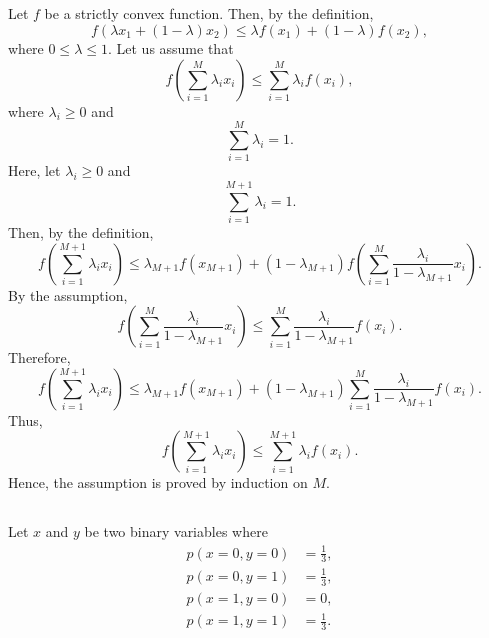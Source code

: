 \subsection{}
\label{1.38}
Let $f$ be a strictly convex function.
Then, by the definition,
%
\begin{equation}
f 
\left( 
	\lambda 
	x_1 
	+ 
	(1 - \lambda) 
	x_2 
\right) 
\leq 
\lambda 
f(x_1) 
+ 
(1 - \lambda) 
f(x_2),
\end{equation}
%
where $0 \leq \lambda \leq 1$.
Let us assume that 
%
\begin{equation}
f 
\left( 
	\sum_{i = 1}^{M} 
	\lambda_i 
	x_i 
\right) 
\leq 
\sum_{i = 1}^{M} 
\lambda_i 
f(x_i),
\end{equation}
%
where $\lambda_i \geq 0$ and
%
\begin{equation}
\sum_{i = 1}^{M} 
\lambda_i 
= 
1.
\end{equation}
%
Here, let $\lambda_i \geq 0$ and
%
\begin{equation}
\sum_{i = 1}^{M + 1} 
\lambda_i 
= 
1.
\end{equation}
%
Then, by the definition,
%
\begin{equation}
f 
\left( 
	\sum_{i = 1}^{M + 1} 
	\lambda_i x_i 
\right) 
\leq 
\lambda_{M + 1} 
f ( x_{M + 1} ) 
+ 
(1 - \lambda_{M + 1}) 
f 
\left( 
	\sum_{i = 1}^{M} 
	\frac{\lambda_i}{1 - \lambda_{M + 1}} 
	x_i 
\right).
\end{equation}
%
By the assumption,
%
\begin{equation}
f 
\left( 
	\sum_{i = 1}^{M} 
	\frac{\lambda_i}{1 - \lambda_{M + 1}} 
	x_i 
\right) 
\leq 
\sum_{i = 1}^{M} 
\frac{\lambda_i}{1 - \lambda_{M + 1}} 
f(x_i).
\end{equation}
%
Therefore,
%
\begin{equation}
f 
\left( 
	\sum_{i = 1}^{M + 1} 
	\lambda_i 
	x_i 
\right) 
\leq 
\lambda_{M + 1} 
f ( x_{M + 1} ) 
+ 
(1 - \lambda_{M + 1}) 
\sum_{i = 1}^{M} 
\frac{\lambda_i}{1 - \lambda_{M + 1}} 
f(x_i).
\end{equation}
%
Thus,
%
\begin{equation}
f 
\left( 
	\sum_{i = 1}^{M + 1} 
	\lambda_i 
	x_i 
\right) 
\leq 
\sum_{i = 1}^{M + 1} 
\lambda_i 
f(x_i).
\end{equation}
%
Hence, the assumption is proved by induction on $M$.


\subsection{}
\label{1.39}
Let $x$ and $y$ be two binary variables where
%
\begin{equation}
\begin{aligned}
p(x = 0, y = 0) 
&= 
\frac{1}{3}, \\
p(x = 0, y = 1) 
&= 
\frac{1}{3}, \\
p(x = 1, y = 0) 
&= 
0, \\
p(x = 1, y = 1) 
&= 
\frac{1}{3}.
\end{aligned}
\end{equation}
%


